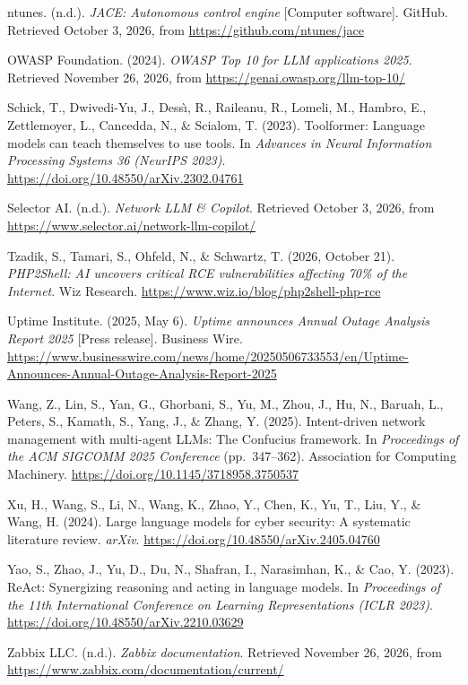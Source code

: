 \begin{list}{}{%
  \setlength{\leftmargin}{2.2em}%
  \setlength{\itemindent}{-2.2em}%
  \setlength{\itemsep}{0.6em}%
  \setlength{\parsep}{0pt}}
\item ntunes. (n.d.). \textit{JACE: Autonomous control engine} [Computer
software]. GitHub. Retrieved October 3, 2026, from
\url{https://github.com/ntunes/jace}

\item OWASP Foundation. (2024). \textit{OWASP Top 10 for LLM applications
2025}. Retrieved November 26, 2026, from \url{https://genai.owasp.org/llm-top-10/}

\item Schick, T., Dwivedi-Yu, J., Dess\`{\i}, R., Raileanu, R., Lomeli, M.,
Hambro, E., Zettlemoyer, L., Cancedda, N., \& Scialom, T. (2023). Toolformer:
Language models can teach themselves to use tools. In \textit{Advances in
Neural Information Processing Systems 36 (NeurIPS 2023)}.
\url{https://doi.org/10.48550/arXiv.2302.04761}

\item Selector AI. (n.d.). \textit{Network LLM \& Copilot}. Retrieved October
3, 2026, from \url{https://www.selector.ai/network-llm-copilot/}

\item Tzadik, S., Tamari, S., Ohfeld, N., \& Schwartz, T. (2026, October 21).
\textit{PHP2Shell: AI uncovers critical RCE vulnerabilities affecting 70\% of
the Internet}. Wiz Research.
\url{https://www.wiz.io/blog/php2shell-php-rce}

\item Uptime Institute. (2025, May 6). \textit{Uptime announces Annual Outage
Analysis Report 2025} [Press release]. Business Wire.
\url{https://www.businesswire.com/news/home/20250506733553/en/Uptime-Announces-Annual-Outage-Analysis-Report-2025}

\item Wang, Z., Lin, S., Yan, G., Ghorbani, S., Yu, M., Zhou, J., Hu, N.,
Baruah, L., Peters, S., Kamath, S., Yang, J., \& Zhang, Y. (2025).
Intent-driven network management with multi-agent LLMs: The Confucius
framework. In \textit{Proceedings of the ACM SIGCOMM 2025 Conference}
(pp.~347--362). Association for Computing Machinery.
\url{https://doi.org/10.1145/3718958.3750537}

\item Xu, H., Wang, S., Li, N., Wang, K., Zhao, Y., Chen, K., Yu, T., Liu, Y.,
\& Wang, H. (2024). Large language models for cyber security: A systematic
literature review. \textit{arXiv}. \url{https://doi.org/10.48550/arXiv.2405.04760}

\item Yao, S., Zhao, J., Yu, D., Du, N., Shafran, I., Narasimhan, K., \& Cao,
Y. (2023). ReAct: Synergizing reasoning and acting in language models. In
\textit{Proceedings of the 11th International Conference on Learning
Representations (ICLR 2023)}. \url{https://doi.org/10.48550/arXiv.2210.03629}

\item Zabbix LLC. (n.d.). \textit{Zabbix documentation}. Retrieved November 26,
2026, from \url{https://www.zabbix.com/documentation/current/}

\end{list}
